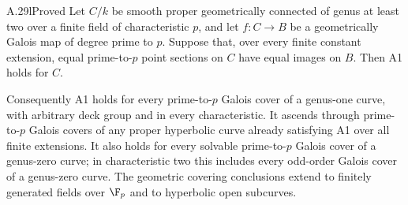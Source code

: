 \begin{claim}{A.29l}{Proved}
Let $C/k$ be smooth proper geometrically connected of genus
at least two over a finite field of characteristic $p$, and
let $f:C\to B$ be a geometrically Galois map of degree prime
to $p$. Suppose that, over every finite constant extension,
equal prime-to-$p$ point sections on $C$ have equal images
on $B$. Then A1 holds for $C$.

Consequently A1 holds for every prime-to-$p$ Galois cover
of a genus-one curve, with arbitrary deck group and in every
characteristic. It ascends through prime-to-$p$ Galois covers
of any proper hyperbolic curve already satisfying A1 over
all finite extensions. It also holds for every solvable
prime-to-$p$ Galois cover of a genus-zero curve; in
characteristic two this includes every odd-order Galois
cover of a genus-zero curve. The geometric covering
conclusions extend to finitely generated fields over
$\F_p$ and to hyperbolic open subcurves.
\end{claim}
